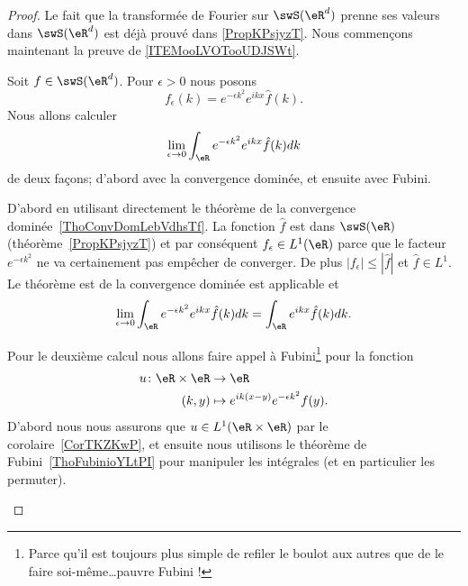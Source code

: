 \begin{proof}
	Le fait que la transformée de Fourier sur \( \swS(\eR^d)\) prenne ses valeurs dans \( \swS(\eR^d)\) est déjà prouvé dans \ref{PropKPsjyzT}. Nous commençons maintenant la preuve de \ref{ITEMooLVOTooUDJSWt}.

	Soit \( f\in \swS(\eR^d)\). Pour \( \epsilon>0\) nous posons
	\begin{equation}
		f_{\epsilon}(k)= e^{-\epsilon k^2} e^{ikx}\hat f(k).
	\end{equation}
	Nous allons calculer
	\begin{equation}
		\lim_{\epsilon\to 0}\int_{\eR} e^{-\epsilon k^2} e^{ikx}\hat f(k)dk
	\end{equation}
	de deux façons; d'abord avec la convergence dominée, et ensuite avec Fubini.

	\begin{subproof}
		D'abord en utilisant directement le théorème de la convergence dominée~\ref{ThoConvDomLebVdhsTf}. La fonction \( \hat f\) est dans \( \swS(\eR)\) (théorème~\ref{PropKPsjyzT}) et par conséquent \( f_{\epsilon}\in L^1(\eR)\) parce que le facteur \(  e^{-\epsilon k^2}\) ne va certainement pas empêcher de converger. De plus \( | f_{\epsilon} |\leq | \hat f |\) et \( \hat f\in L^1\). Le théorème est de la convergence dominée est applicable et
		\begin{equation}        \label{EQooYIYGooXYubbW}
			\lim_{\epsilon\to 0}\int_{\eR} e^{-\epsilon k^2} e^{ikx}\hat f(k)dk=\int_{\eR} e^{ikx}\hat f(k)dk.
		\end{equation}


		Pour le deuxième calcul nous allons faire appel à Fubini\footnote{Parce qu'il est toujours plus simple de refiler le boulot aux autres que de le faire soi-même\ldots pauvre Fubini !} pour la fonction
		\begin{equation}
			\begin{aligned}
				u\colon \eR\times \eR & \to \eR                                     \\
				(k,y)                 & \mapsto  e^{ik(x-y)} e^{-\epsilon k^2}f(y).
			\end{aligned}
		\end{equation}
		D'abord nous nous assurons que \( u\in L^1(\eR\times \eR)\) par le corolaire~\ref{CorTKZKwP}, et ensuite nous utilisons le théorème de Fubini~\ref{ThoFubinioYLtPI} pour manipuler les intégrales (et en particulier les permuter).


\end{subproof}
\end{proof}
